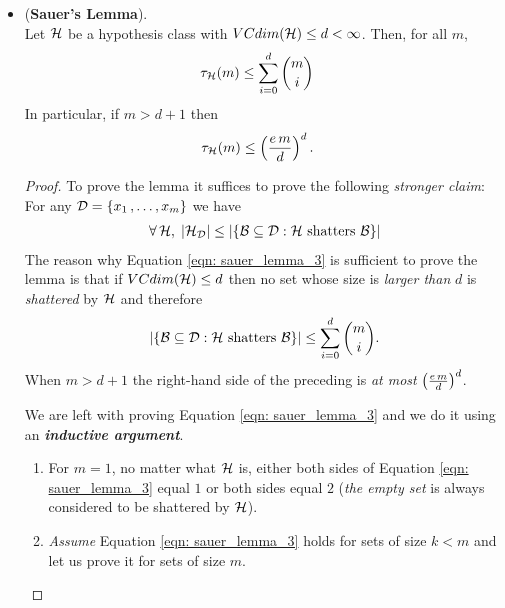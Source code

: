 \documentclass[11pt]{article}
\begin{document}
\begin{itemize}
\item \begin{lemma} (\textbf{Sauer's Lemma}). \citep{shalev2014understanding, mohri2018foundations}\\
Let ${\mathcal H}$ be a hypothesis class with $VCdim({\mathcal H}) \le d < \infty$. Then, for all $m$, 
\begin{align}
\tau_{{\mathcal H}}(m) &\le \sum_{i=0}^{d}{{m}\choose{i}} \label{eqn: sauer_lemma_1}
\end{align}
In particular, if $m > d + 1$ then
\begin{align}
\tau_{{\mathcal H}}(m) &\le \left(\frac{e\,m}{d}\right)^{d}. \label{eqn: sauer_lemma_2}
\end{align}
\end{lemma}
\begin{proof}
To prove the lemma it suffices to prove the following \emph{stronger claim}: For any ${\mathcal D} = \left\{x_1 \,{,}\ldots{,}\, x_m\right\}$ we have
\begin{align}
\forall\, {\mathcal H}, \; \left\lvert {\mathcal H}_{{\mathcal D}} \right\rvert \le  \left\lvert \left\{{\mathcal B} \subseteq {\mathcal D}: {\mathcal H}\text{ shatters }{\mathcal B}\right\} \right\rvert\label{eqn: sauer_lemma_3}
\end{align} The reason why Equation \eqref{eqn: sauer_lemma_3} is sufficient to prove the lemma is that if
$VCdim({\mathcal H}) \le d$ then no set whose size is \emph{larger than} $d$ is \emph{shattered} by ${\mathcal H}$ and therefore
\begin{align*}
\left\lvert \left\{{\mathcal B} \subseteq {\mathcal D}: {\mathcal H}\text{ shatters }{\mathcal B}\right\} \right\rvert \le  \sum_{i=0}^{d}{{m}\choose{i}}.
\end{align*}
When $m > d + 1$ the right-hand side of the preceding is \emph{at most} $\left(\frac{e\,m}{d}\right)^{d}$.

We are left with proving Equation \eqref{eqn: sauer_lemma_3} and we do it using an \emph{\textbf{inductive argument}}. 
\begin{enumerate}
\item For $m = 1$, no matter what ${\mathcal H}$ is, either both sides of Equation \eqref{eqn: sauer_lemma_3} equal $1$ or both sides equal $2$ (\emph{the empty set} is always considered to be shattered by ${\mathcal H}$).

\item  \emph{Assume} Equation \eqref{eqn: sauer_lemma_3} holds for sets of size $k < m$ and let us prove it for sets of size $m$. 


\end{enumerate}
\end{proof}
\end{itemize}
\end{document}
